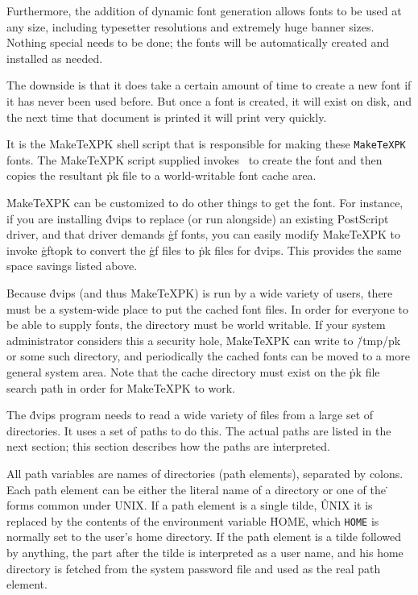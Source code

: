 Furthermore, the addition of dynamic font generation allows fonts to be
used at any size, including typesetter resolutions and extremely huge
banner sizes.  Nothing special needs to be done; the fonts will be
automatically created and installed as needed.

The downside is that it does take a certain amount of time to create a new
font if it has never been used before.	But once a font is created, it
will exist on disk, and the next time that document is printed it will print
very quickly.

It is the \.{MakeTeXPK} shell script that is responsible for making these
\^{{\tt MakeTeXPK}}
fonts.	The \.{MakeTeXPK} script supplied invokes \MF\ to create the font and
then copies the resultant \.{pk} file to a world-writable font cache area.

\.{MakeTeXPK} can be customized to do other things to get the font.  For
instance, if you are installing \.{dvips} to replace (or run alongside)
an existing PostScript driver, and that driver demands \.{gf} fonts, you
can easily modify \.{MakeTeXPK} to invoke \.{gftopk} to convert the
\.{gf} files to \.{pk} files for \.{dvips}.  This provides the same space
savings listed above.

Because \.{dvips} (and thus \.{MakeTeXPK}) is run by a wide variety of users,
there must be a system-wide place to put the cached font files.  In order
for everyone to be able to supply fonts, the directory must be world
writable.  If your system administrator considers this a security hole,
\.{MakeTeXPK} can write to \.{/tmp/pk} or some such directory, and
periodically the cached fonts can be moved to a more general system area.
Note that the cache directory must exist on the \.{pk} file search path
in order for \.{MakeTeXPK} to work.


The \.{dvips} program needs to read a wide variety of files from a large
set of directories.  It uses a set of paths to do this.  The actual
paths are listed in the next section; this section describes how the
paths are interpreted.

All path variables are names of directories (path elements),
separated by colons.
Each path element can be either the literal name of a directory or one
of the \.{\tilde} forms common under UNIX.  If a path element is a single tilde,
\^{UNIX}
it is replaced by the contents of the environment variable \.{HOME}, which
\^{{\tt HOME}}
is normally set to the user's home directory.  If the path element is
a tilde followed by anything, the part after the tilde is interpreted as
a user name, and his home directory is fetched from the system password
file and used as the real path element.

